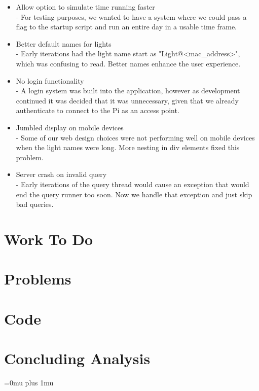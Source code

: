 \documentclass[10pt,draftclsnofoot,onecolumn]{IEEEtran}
\begin{document}
\begin{itemize}
    \item Allow option to simulate time running faster\\
	  - For testing purposes, we wanted to have a system where 
            we could pass a flag to the startup script and run an entire
            day in a usable time frame. 
    \item Better default names for lights\\ 
          - Early iterations had the light name start as "Light@<mac\_address>",
            which was confusing to read. Better names enhance the user experience.
    \item No login functionality\\
          - A login system was built into the application, however as development
            continued it was decided that it was unnecessary, given that we already
            authenticate to connect to the Pi as an access point.
    \item Jumbled display on mobile devices\\
          - Some of our web design choices were not performing well on mobile
            devices when the light names were long. More nesting in div elements
            fixed this problem.
    \item Server crash on invalid query\\
          - Early iterations of the query thread would cause an exception that would
            end the query runner too soon. Now we handle that exception and just skip 
            bad queries.
\end{itemize}

\section{Work To Do}

\section{Problems}

\section{Code}

\section{Concluding Analysis}

\newpage
\Urlmuskip=0mu plus 1mu\relax
{}

\end{document}
